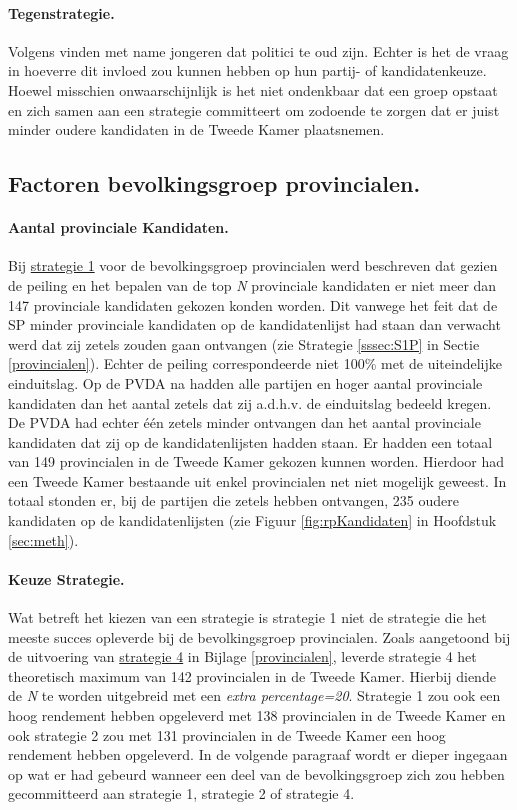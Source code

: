 \paragraph{Tegenstrategie.}
Volgens \cite{aalberts2006aantrekkelijke} vinden met name jongeren dat politici te oud zijn. Echter is het de vraag in hoeverre dit invloed zou kunnen hebben op hun partij- of kandidatenkeuze. Hoewel misschien onwaarschijnlijk is het niet ondenkbaar dat een groep opstaat en zich samen aan een strategie committeert om zodoende te zorgen dat er juist minder oudere kandidaten in de Tweede Kamer plaatsnemen. 

\subsection{Factoren bevolkingsgroep provincialen.}
\label{percP}

\paragraph{Aantal provinciale Kandidaten.} 
Bij \hyperref[S1A]{strategie 1} voor de bevolkingsgroep provincialen werd beschreven dat gezien de peiling en het bepalen van de top \textit{N} provinciale kandidaten er niet meer dan 147 provinciale kandidaten gekozen konden worden. Dit vanwege het feit dat de SP minder provinciale kandidaten op de kandidatenlijst had staan dan verwacht werd dat zij zetels zouden gaan ontvangen (zie Strategie \ref{sssec:S1P} in Sectie \ref{provincialen}). Echter de peiling correspondeerde niet 100\% met de uiteindelijke einduitslag. Op de PVDA na hadden alle partijen en hoger aantal provinciale kandidaten dan het aantal zetels dat zij a.d.h.v. de einduitslag bedeeld kregen. De PVDA had echter één zetels minder ontvangen dan het aantal provinciale kandidaten dat zij op de kandidatenlijsten hadden staan. Er hadden een totaal van 149 provincialen in de Tweede Kamer gekozen kunnen worden. Hierdoor had een Tweede Kamer bestaande uit enkel provincialen net niet mogelijk geweest. In totaal stonden er, bij de partijen die zetels hebben ontvangen, 235 oudere kandidaten op de kandidatenlijsten (zie Figuur \ref{fig:rpKandidaten} in Hoofdstuk \ref{sec:meth}).

\paragraph{Keuze Strategie.}
Wat betreft het kiezen van een strategie is strategie 1 niet de strategie die het meeste succes opleverde bij de bevolkingsgroep provincialen. Zoals aangetoond bij de uitvoering van \hyperref[S4P]{strategie 4} in Bijlage \ref{provincialen}, leverde strategie 4 het theoretisch maximum van 142 provincialen in de Tweede Kamer. Hierbij diende de \textit{N} te worden uitgebreid met een \textit{extra percentage=20}. Strategie 1 zou ook een hoog rendement hebben opgeleverd met 138 provincialen in de Tweede Kamer en ook strategie 2 zou met 131 provincialen in de Tweede Kamer een hoog rendement hebben opgeleverd. In de volgende paragraaf wordt er dieper ingegaan op wat er had gebeurd wanneer een deel van de bevolkingsgroep zich zou hebben gecommitteerd aan strategie 1, strategie 2 of strategie 4.

